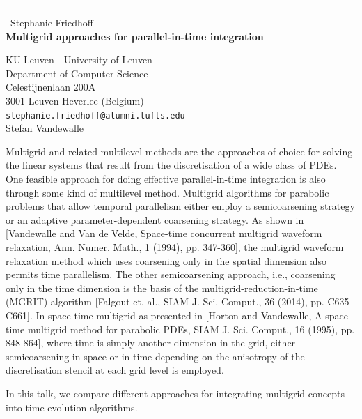 \documentclass{report}
\begin{document}
\begin{center}
\rule{6in}{1pt} \
{\large Stephanie Friedhoff \\
{\bf Multigrid approaches for parallel-in-time integration}}

KU Leuven - University of Leuven \\ Department of Computer Science \\ Celestijnenlaan 200A \\ 3001 Leuven-Heverlee (Belgium)
\\
{\tt stephanie.friedhoff@alumni.tufts.edu}\\
Stefan Vandewalle\end{center}

Multigrid and related multilevel methods are the approaches of choice for
solving the linear systems that result from the discretisation of a wide
class of PDEs. One feasible approach for doing effective parallel-in-time
integration is also through some kind of multilevel method. Multigrid
algorithms for parabolic problems that allow temporal parallelism either
employ a semicoarsening strategy or an adaptive parameter-dependent
coarsening strategy. As shown in [Vandewalle and Van de Velde, Space-time
concurrent multigrid waveform relaxation, Ann. Numer. Math., 1 (1994),
pp. 347-360], the multigrid waveform relaxation method which uses
coarsening only in the spatial dimension also permits time parallelism.
The other semicoarsening approach, i.e., coarsening only in the time
dimension is the basis of the multigrid-reduction-in-time (MGRIT)
algorithm [Falgout et. al., SIAM J. Sci. Comput., 36 (2014), pp.
C635-C661]. In space-time multigrid as presented in [Horton and
Vandewalle, A space-time multigrid method for parabolic PDEs, SIAM J.
Sci. Comput., 16 (1995), pp. 848-864], where time is simply another
dimension in the grid, either semicoarsening in space or in time
depending on the anisotropy of the discretisation stencil at each grid
level is employed.

In this talk, we compare different approaches for integrating multigrid
concepts into time-evolution algorithms.
\end{document}
